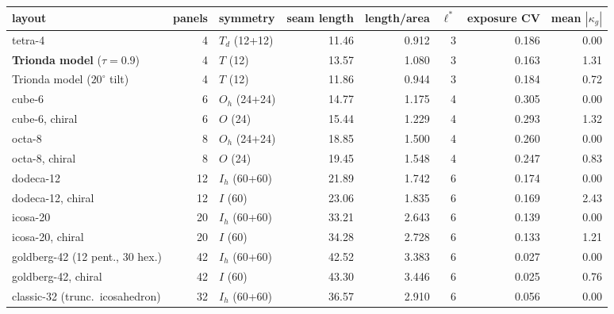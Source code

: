 \begin{tabular}{@{}lrlrrrrr@{}}
\toprule
layout & panels & symmetry & seam length & length/area & $\ell^*$ & exposure CV & mean $|\kappa_g|$ \\
\midrule
tetra-4 & 4 & $T_d$ (12+12) & 11.46 & 0.912 & 3 & 0.186 & 0.00 \\
\textbf{Trionda model} ($\tau=0.9$) & 4 & $T$ (12) & 13.57 & 1.080 & 3 & 0.163 & 1.31 \\
Trionda model ($20^\circ$ tilt) & 4 & $T$ (12) & 11.86 & 0.944 & 3 & 0.184 & 0.72 \\
\addlinespace
cube-6 & 6 & $O_h$ (24+24) & 14.77 & 1.175 & 4 & 0.305 & 0.00 \\
cube-6, chiral & 6 & $O$ (24) & 15.44 & 1.229 & 4 & 0.293 & 1.32 \\
octa-8 & 8 & $O_h$ (24+24) & 18.85 & 1.500 & 4 & 0.260 & 0.00 \\
octa-8, chiral & 8 & $O$ (24) & 19.45 & 1.548 & 4 & 0.247 & 0.83 \\
\addlinespace
dodeca-12 & 12 & $I_h$ (60+60) & 21.89 & 1.742 & 6 & 0.174 & 0.00 \\
dodeca-12, chiral & 12 & $I$ (60) & 23.06 & 1.835 & 6 & 0.169 & 2.43 \\
\addlinespace
icosa-20 & 20 & $I_h$ (60+60) & 33.21 & 2.643 & 6 & 0.139 & 0.00 \\
icosa-20, chiral & 20 & $I$ (60) & 34.28 & 2.728 & 6 & 0.133 & 1.21 \\
\addlinespace
goldberg-42 (12 pent., 30 hex.) & 42 & $I_h$ (60+60) & 42.52 & 3.383 & 6 & 0.027 & 0.00 \\
goldberg-42, chiral & 42 & $I$ (60) & 43.30 & 3.446 & 6 & 0.025 & 0.76 \\
\addlinespace
classic-32 (trunc.\ icosahedron) & 32 & $I_h$ (60+60) & 36.57 & 2.910 & 6 & 0.056 & 0.00 \\
\bottomrule
\end{tabular}
